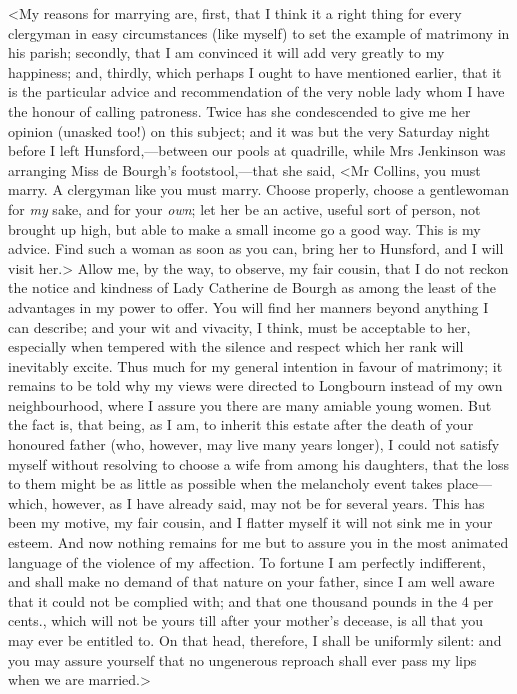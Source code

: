 <My reasons for marrying are, first, that I think it a right thing for every clergyman in easy circumstances (like myself) to set the example of matrimony in his parish; secondly, that I am convinced it will add very greatly to my happiness; and, thirdly, which perhaps I ought to have mentioned earlier, that it is the particular advice and recommendation of the very noble lady whom I have the honour of calling patroness. Twice has she condescended to give me her opinion (unasked too!) on this subject; and it was but the very Saturday night before I left Hunsford,—between our pools at quadrille, while Mrs Jenkinson was arranging Miss de Bourgh's footstool,—that she said, <Mr Collins, you must marry. A clergyman like you must marry. Choose properly, choose a gentlewoman for \textit{my} sake, and for your \textit{own}; let her be an active, useful sort of person, not brought up high, but able to make a small income go a good way. This is my advice. Find such a woman as soon as you can, bring her to Hunsford, and I will visit her.> Allow me, by the way, to observe, my fair cousin, that I do not reckon the notice and kindness of Lady Catherine de Bourgh as among the least of the advantages in my power to offer. You will find her manners beyond anything I can describe; and your wit and vivacity, I think, must be acceptable to her, especially when tempered with the silence and respect which her rank will inevitably excite. Thus much for my general intention in favour of matrimony; it remains to be told why my views were directed to Longbourn instead of my own neighbourhood, where I assure you there are many amiable young women. But the fact is, that being, as I am, to inherit this estate after the death of your honoured father (who, however, may live many years longer), I could not satisfy myself without resolving to choose a wife from among his daughters, that the loss to them might be as little as possible when the melancholy event takes place—which, however, as I have already said, may not be for several years. This has been my motive, my fair cousin, and I flatter myself it will not sink me in your esteem. And now nothing remains for me but to assure you in the most animated language of the violence of my affection. To fortune I am perfectly indifferent, and shall make no demand of that nature on your father, since I am well aware that it could not be complied with; and that one thousand pounds in the 4 per cents., which will not be yours till after your mother's decease, is all that you may ever be entitled to. On that head, therefore, I shall be uniformly silent: and you may assure yourself that no ungenerous reproach shall ever pass my lips when we are married.>


